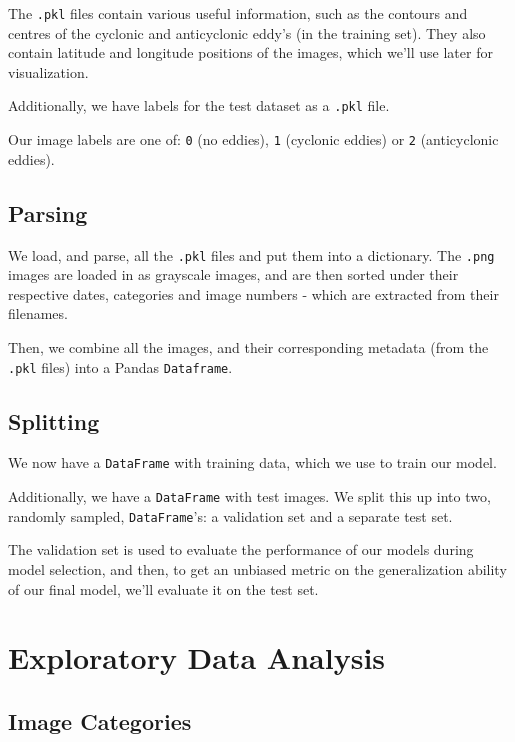 \documentclass[12pt,a4paper,english]{article}
\begin{document}
    The \verb|.pkl| files contain various useful information, such as the contours and centres of the cyclonic and anticyclonic eddy's (in the training set).
    They also contain latitude and longitude positions of the images, which we'll use later for visualization.

    Additionally, we have labels for the test dataset as a \verb|.pkl| file.

    Our image labels are one of: \verb|0| (no eddies), \verb|1| (cyclonic eddies) or \verb|2| (anticyclonic eddies).

    \subsection{Parsing}

    We load, and parse, all the \verb|.pkl| files and put them into a dictionary.
    The \verb|.png| images are loaded in as grayscale images, and are then sorted under their respective dates, categories and image numbers - which are extracted from their filenames.
    
    Then, we combine all the images, and their corresponding metadata (from the \verb|.pkl| files) into a Pandas \verb|Dataframe|.

    \subsection{Splitting}

    We now have a \verb|DataFrame| with training data, which we use to train our model.

    Additionally, we have a \verb|DataFrame| with test images.
    We split this up into two, randomly sampled, \verb|DataFrame|'s: a validation set and a separate test set.
    
    The validation set is used to evaluate the performance of our models during model selection, and then, to get an unbiased metric on the
    generalization ability of our final model, we'll evaluate it on the test set.

    \section{Exploratory Data Analysis}    

    \subsection{Image Categories}
\end{document}
